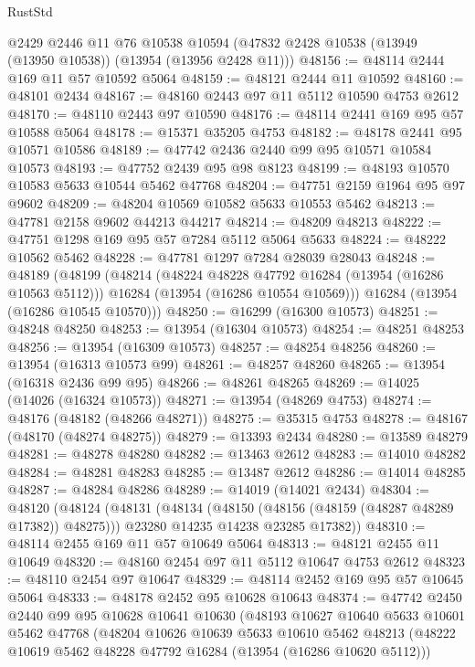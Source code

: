 \begin{lexlean}{RustStd}
\begin{coremodule}
    @2429
    @2446
    @11
    @76
    @10538
    @10594
    (@47832 @2428 @10538 (@13949 (@13950 @10538)) (@13954 (@13956 @2428 @11)))
@48156 := @48114 @2444 @169 @11 @57 @10592 @5064
@48159 := @48121 @2444 @11 @10592
@48160 := @48101 @2434
@48167 := @48160 @2443 @97 @11 @5112 @10590 @4753 @2612
@48170 := @48110 @2443 @97 @10590
@48176 := @48114 @2441 @169 @95 @57 @10588 @5064
@48178 := @15371 @35205 @4753
@48182 := @48178 @2441 @95 @10571 @10586
@48189 := @47742 @2436 @2440 @99 @95 @10571 @10584 @10573
@48193 := @47752 @2439 @95 @98 @8123
@48199 := @48193 @10570 @10583 @5633 @10544 @5462 @47768
@48204 := @47751 @2159 @1964 @95 @97 @9602
@48209 := @48204 @10569 @10582 @5633 @10553 @5462
@48213 := @47781 @2158 @9602 @44213 @44217
@48214 := @48209 @48213
@48222 := @47751 @1298 @169 @95 @57 @7284 @5112 @5064 @5633
@48224 := @48222 @10562 @5462
@48228 := @47781 @1297 @7284 @28039 @28043
@48248 := @48189
    (@48199
      (@48214
        (@48224 @48228 @47792 @16284 (@13954 (@16286 @10563 @5112)))
        @16284
        (@13954 (@16286 @10554 @10569)))
      @16284
      (@13954 (@16286 @10545 @10570)))
@48250 := @16299 (@16300 @10573)
@48251 := @48248 @48250
@48253 := @13954 (@16304 @10573)
@48254 := @48251 @48253
@48256 := @13954 (@16309 @10573)
@48257 := @48254 @48256
@48260 := @13954 (@16313 @10573 @99)
@48261 := @48257 @48260
@48265 := @13954 (@16318 @2436 @99 @95)
@48266 := @48261 @48265
@48269 := @14025 (@14026 (@16324 @10573))
@48271 := @13954 (@48269 @4753)
@48274 := @48176 (@48182 (@48266 @48271))
@48275 := @35315 @4753
@48278 := @48167 (@48170 (@48274 @48275))
@48279 := @13393 @2434
@48280 := @13589 @48279
@48281 := @48278 @48280
@48282 := @13463 @2612
@48283 := @14010 @48282
@48284 := @48281 @48283
@48285 := @13487 @2612
@48286 := @14014 @48285
@48287 := @48284 @48286
@48289 := @14019 (@14021 @2434)
@48304 := @48120
    (@48124
      (@48131
        (@48134 (@48150 (@48156 (@48159 (@48287 @48289 @17382)) @48275)))
        @23280
        @14235
        @14238
        @23285
        @17382))
@48310 := @48114 @2455 @169 @11 @57 @10649 @5064
@48313 := @48121 @2455 @11 @10649
@48320 := @48160 @2454 @97 @11 @5112 @10647 @4753 @2612
@48323 := @48110 @2454 @97 @10647
@48329 := @48114 @2452 @169 @95 @57 @10645 @5064
@48333 := @48178 @2452 @95 @10628 @10643
@48374 := @47742
    @2450
    @2440
    @99
    @95
    @10628
    @10641
    @10630
    (@48193
      @10627
      @10640
      @5633
      @10601
      @5462
      @47768
      (@48204
        @10626
        @10639
        @5633
        @10610
        @5462
        @48213
        (@48222 @10619 @5462 @48228 @47792 @16284 (@13954 (@16286 @10620 @5112)))

\end{coremodule}
\end{lexlean}
